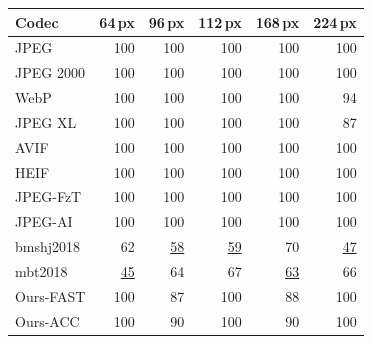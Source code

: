 \begin{tabular}{lrrrrr}
\toprule
Codec & 64\,px & 96\,px & 112\,px & 168\,px & 224\,px \\
\midrule
JPEG & 100 & 100 & 100 & 100 & 100 \\
JPEG 2000 & 100 & 100 & 100 & 100 & 100 \\
WebP & 100 & 100 & 100 & 100 & 94 \\
JPEG XL & 100 & 100 & 100 & 100 & 87 \\
AVIF & 100 & 100 & 100 & 100 & 100 \\
HEIF & 100 & 100 & 100 & 100 & 100 \\
JPEG-FzT & 100 & 100 & 100 & 100 & 100 \\
JPEG-AI & 100 & 100 & 100 & 100 & 100 \\
bmshj2018 & 62 & \cellcolor{red!22}\underline{58} & \cellcolor{red!22}\underline{59} & 70 & \cellcolor{red!22}\underline{47} \\
mbt2018 & \cellcolor{red!22}\underline{45} & 64 & 67 & \cellcolor{red!22}\underline{63} & 66 \\
Ours-FAST & 100 & 87 & 100 & 88 & 100 \\
Ours-ACC & 100 & 90 & 100 & 90 & 100 \\
\bottomrule
\end{tabular}
